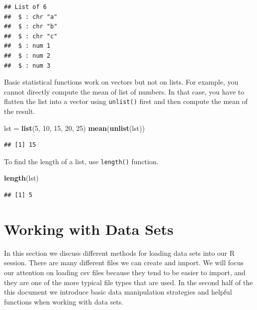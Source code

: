 \documentclass[
]{book}
\newenvironment{Shaded}{\begin{snugshade}}{\end{snugshade}}
\newcommand{\DecValTok}[1]{\textcolor[rgb]{0.00,0.00,0.81}{#1}}
\newcommand{\KeywordTok}[1]{\textcolor[rgb]{0.13,0.29,0.53}{\textbf{#1}}}
\newcommand{\NormalTok}[1]{#1}
\newcommand{\StringTok}[1]{\textcolor[rgb]{0.31,0.60,0.02}{#1}}
\begin{document}
\begin{verbatim}
## List of 6
##  $ : chr "a"
##  $ : chr "b"
##  $ : chr "c"
##  $ : num 1
##  $ : num 2
##  $ : num 3
\end{verbatim}

Basic statistical functions work on vectors but not on lists. For example, you cannot directly compute the mean of list of numbers. In that case, you have to flatten the list into a vector using \texttt{unlist()} first and then compute the mean of the result.

\begin{Shaded}
\begin{Highlighting}[]
\NormalTok{lst =}\StringTok{ }\KeywordTok{list}\NormalTok{(}\DecValTok{5}\NormalTok{, }\DecValTok{10}\NormalTok{, }\DecValTok{15}\NormalTok{, }\DecValTok{20}\NormalTok{, }\DecValTok{25}\NormalTok{)}
\KeywordTok{mean}\NormalTok{(}\KeywordTok{unlist}\NormalTok{(lst))}
\end{Highlighting}
\end{Shaded}

\begin{verbatim}
## [1] 15
\end{verbatim}

To find the length of a list, use \texttt{length()} function.

\begin{Shaded}
\begin{Highlighting}[]
\KeywordTok{length}\NormalTok{(lst)}
\end{Highlighting}
\end{Shaded}

\begin{verbatim}
## [1] 5
\end{verbatim}

\hypertarget{working-with-data-sets}{%
\chapter{Working with Data Sets}\label{working-with-data-sets}}

In this section we discuss different methods for loading data sets into our R session. There are many different files we can create and import. We will focus our attention on loading csv files because they tend to be easier to import, and they are one of the more typical file types that are used. In the second half of the this document we introduce basic data manipulation strategies and helpful functions when working with data sets.
\end{document}
